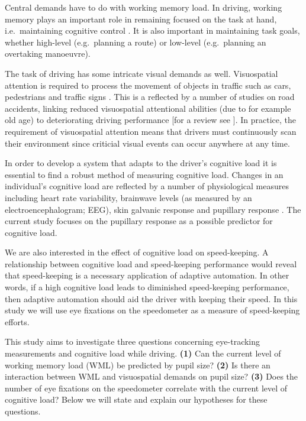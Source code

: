 Central demands have to do with working memory load.
In driving, working memory plays an important role in remaining focused on the task at hand, i.e.\ maintaining cognitive control \citep{Wood2016}.
It is also important in maintaining task goals, whether high-level (e.g.\ planning a route) or low-level (e.g.\ planning an overtaking manoeuvre).

The task of driving has some intricate visual demands as well.
Visuospatial attention is required to process the movement of objects in traffic such as cars, pedestrians and traffic signs \citep{Zheng2020}.
This is a reflected by a number of studies on road accidents, linking reduced visuospatial attentional abilities (due to for example old age) to deteriorating driving performance [for a review see \citet{Owsley2010}].
In practice, the requirement of visuospatial attention means that drivers must continuously scan their environment since criticial visual events can occur anywhere at any time.

In order to develop a system that adapts to the driver's cognitive load it is essential to find a robust method of measuring cognitive load.
Changes in an individual's cognitive load are reflected by a number of physiological measures including heart rate variability, brainwave levels (as measured by an electroencephalogram; EEG), skin galvanic response and pupillary response \citep{Haapalainen2010}.
The current study focuses on the pupillary response as a possible predictor for cognitive load.

We are also interested in the effect of cognitive load on speed-keeping.
A relationship between cognitive load and speed-keeping performance would reveal that speed-keeping is a necessary application of adaptive automation. 
In other words, if a high cognitive load leads to diminished speed-keeping performance, then adaptive automation should aid the driver with keeping their speed.
In this study we will use eye fixations on the speedometer as a measure of speed-keeping efforts. 

This study aims to investigate three questions concerning eye-tracking measurements and cognitive load while driving.
\textbf{(1)} Can the current level of working memory load (WML) be predicted by pupil size?
\textbf{(2)} Is there an interaction between WML and visuospatial demands on pupil size?
\textbf{(3)} Does the number of eye fixations on the speedometer correlate with the current level of cognitive load?
Below we will state and explain our hypotheses for these questions. 

